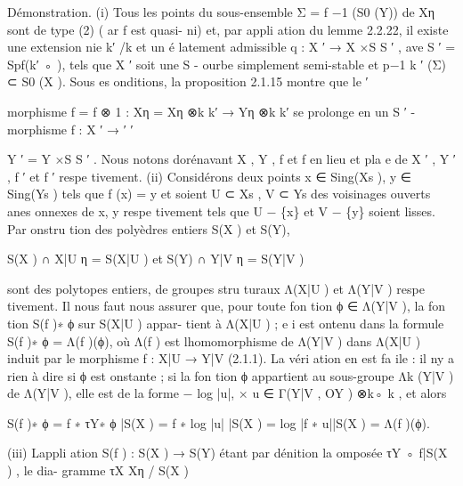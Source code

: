 \documentclass[
  10pt,
]{article}
\newenvironment{Shaded}{}{}
\newcommand{\NormalTok}[1]{#1}
\begin{document}
\begin{Shaded}
\begin{Highlighting}[]
\NormalTok{Démonstration.}
\NormalTok{(i) Tous les points du sous{-}ensemble Σ = f −1 (S0 (Y)) de Xη sont de type (2) ( ar f est quasi{-}}
\NormalTok{ni) et, par appli ation du lemme 2.2.22, il existe une extension nie k′ /k et un é latement}
\NormalTok{admissible q : X ′ → X ×S S ′ , ave S ′ = Spf(k′ ◦ ), tels que X ′ soit une S {-} ourbe simplement}
\NormalTok{semi{-}stable et p−1}
\NormalTok{                 k ′ (Σ) ⊂ S0 (X ). Sous es onditions, la proposition 2.1.15 montre que le}
\NormalTok{                                 ′}

\NormalTok{morphisme f = f ⊗ 1 : Xη = Xη ⊗k k′ → Yη ⊗k k′ se prolonge en un S ′ {-}morphisme f : X ′ →}
\NormalTok{              ′            ′}

\NormalTok{Y ′ = Y ×S S ′ .}
\NormalTok{  Nous notons dorénavant X , Y , f et f en lieu et pla e de X ′ , Y ′ , f ′ et f ′ respe tivement.}
\NormalTok{(ii) Considérons deux points x ∈ Sing(Xs ), y ∈ Sing(Ys ) tels que f (x) = y et soient U ⊂ Xs ,}
\NormalTok{V ⊂ Ys des voisinages ouverts anes onnexes de x, y respe tivement tels que U − \{x\} et}
\NormalTok{V − \{y\} soient lisses. Par onstru tion des polyèdres entiers S(X ) et S(Y),}
                                                               
\NormalTok{                  S(X ) ∩ X|U η = S(X|U ) et S(Y) ∩ Y|V η = S(Y|V )}

\NormalTok{sont des polytopes entiers, de groupes stru turaux Λ(X|U ) et Λ(Y|V ) respe tivement. Il nous}
\NormalTok{faut nous assurer que, pour toute fon tion ϕ ∈ Λ(Y|V ), la fon tion S(f )∗ ϕ sur S(X|U ) appar{-}}
\NormalTok{tient à Λ(X|U ) ; e i est ontenu dans la formule}
\NormalTok{                                        S(f )∗ ϕ = Λ(f )(ϕ),}
\NormalTok{où Λ(f ) est l\textquotesingle{}homomorphisme de Λ(Y|V ) dans Λ(X|U ) induit par le morphisme f : X|U → Y|V}
\NormalTok{(2.1.1). La véri ation en est fa ile :}
\NormalTok{    il n\textquotesingle{}y a rien à dire si ϕ est onstante ;}
\NormalTok{    si la fon tion ϕ appartient au sous{-}groupe Λk (Y|V ) de Λ(Y|V ), elle est de la forme − log |u|,}
\NormalTok{                              ×}
\NormalTok{     u ∈ Γ(Y|V , OY ) ⊗k◦ k , et alors}
                                                                  
\NormalTok{                          S(f )∗ ϕ = f ∗ τY∗ ϕ |S(X ) = f ∗ log |u| |S(X )}
\NormalTok{                                    = log |f ∗ u||S(X )}
\NormalTok{                                    = Λ(f )(ϕ).}

\NormalTok{(iii) L\textquotesingle{}appli ation S(f ) : S(X ) → S(Y) étant par dénition la omposée τY ◦ f|S(X ) , le dia{-}}
\NormalTok{gramme}
\NormalTok{                                                 τX}
\NormalTok{                                         Xη           / S(X )}


\end{Highlighting}
\end{Shaded}
\end{document}
